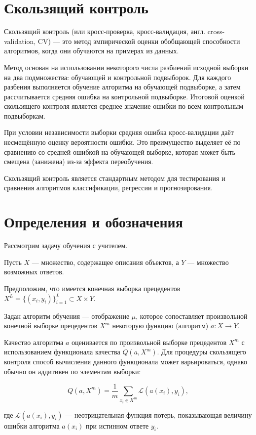 \section{Скользящий контроль}

Скользящий контроль (или кросс-проверка, кросс-валидация, англ. cross-validation, CV) — это метод эмпирической оценки  обобщающей способности алгоритмов, когда они обучаются на примерах из данных.

Метод основан на использовании некоторого числа разбиений исходной выборки на два подмножества: обучающей и контрольной подвыборок. Для каждого разбения выполняется обучение алгоритма на обучающей подвыборке, а затем рассчитывается средняя ошибка на контрольной подвыборке. Итоговой оценкой скользящего контроля является среднее значение ошибки по всем контрольным подвыборкам.

При условии независимости выборки средняя ошибка кросс-валидации даёт несмещённую оценку вероятности ошибки. Это преимущество выделяет её по сравнению со средней ошибкой на обучающей выборке, которая может быть смещена (занижена) из-за эффекта переобучения.

Скользящий контроль является стандартным методом для тестирования и сравнения алгоритмов классификации, регрессии и прогнозирования.

\section{Определения и обозначения}

Рассмотрим задачу обучения с учителем.

Пусть $X$ — множество, содержащее описания объектов, а $Y$ — множество возможных ответов.

Предположим, что имеется конечная выборка прецедентов $X^L = \{(x_i, y_i)\}_{i=1}^L \subset X \times Y$.

Задан алгоритм обучения — отображение $\mu$, которое сопоставляет произвольной конечной выборке прецедентов $X^m$ некоторую функцию (алгоритм) $a : X \to Y$.

Качество алгоритма $a$ оценивается по произвольной выборке прецедентов $X^m$ с использованием функционала качества $Q(a, X^m)$. Для процедуры скользящего контроля способ вычисления данного функционала может варьироваться, однако обычно он аддитивен по элементам выборки:

\[
Q(a, X^m) = \frac{1}{m} \sum_{x_i \in X^m} \mathcal{L}(a(x_i), y_i),
\]

где $\mathcal{L}(a(x_i), y_i)$ — неотрицательная функция потерь, показывающая величину ошибки алгоритма $a(x_i)$ при истинном ответе $y_i$.

